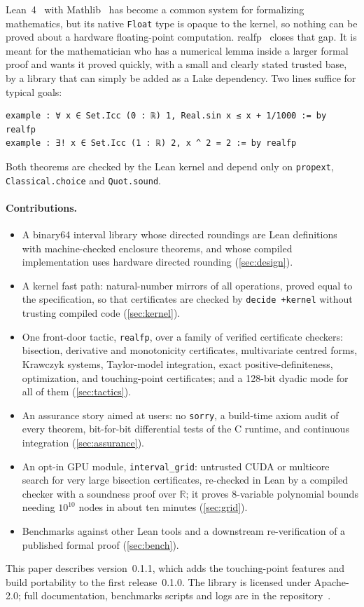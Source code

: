 \documentclass[11pt]{article}
\theoremstyle{definition}
\theoremstyle{remark}
\newcommand{\R}{\mathbb{R}}
\newcommand{\lean}[1]{\texttt{#1}}
\newcommand{\realfp}{\textsf{realfp}}
\begin{document}
Lean~4~\cite{lean4} with Mathlib~\cite{mathlib} has become a common system
for formalizing mathematics, but its native \lean{Float} type is opaque to
the kernel, so nothing can be proved about a hardware floating-point
computation. \realfp{}~\cite{realfp} closes that gap. It is meant for the
mathematician who has a numerical lemma inside a larger formal proof and
wants it proved quickly, with a small and clearly stated trusted base, by a
library that can simply be added as a Lake dependency. Two lines suffice for
typical goals:
\begin{lstlisting}
example : ∀ x ∈ Set.Icc (0 : ℝ) 1, Real.sin x ≤ x + 1/1000 := by realfp
example : ∃! x ∈ Set.Icc (1 : ℝ) 2, x ^ 2 = 2 := by realfp
\end{lstlisting}
Both theorems are checked by the Lean kernel and depend only on
\lean{propext}, \lean{Classical.choice} and \lean{Quot.sound}.

\paragraph{Contributions.}
\begin{itemize}[nosep]
\item A binary64 interval library whose directed roundings are Lean
  definitions with machine-checked enclosure theorems, and whose compiled
  implementation uses hardware directed rounding (\cref{sec:design}).
\item A kernel fast path: natural-number mirrors of all operations, proved
  equal to the specification, so that certificates are checked by
  \lean{decide +kernel} without trusting compiled code (\cref{sec:kernel}).
\item One front-door tactic, \lean{realfp}, over a family of verified
  certificate checkers: bisection, derivative and monotonicity certificates,
  multivariate centred forms, Krawczyk systems, Taylor-model integration,
  exact positive-definiteness, optimization, and touching-point
  certificates; and a 128-bit dyadic mode for all of them (\cref{sec:tactics}).
\item An assurance story aimed at users: no \lean{sorry}, a build-time axiom
  audit of every theorem, bit-for-bit differential tests of the C runtime,
  and continuous integration (\cref{sec:assurance}).
\item An opt-in GPU module, \lean{interval\_grid}: untrusted CUDA or
  multicore search for very large bisection certificates, re-checked in Lean
  by a compiled checker with a soundness proof over $\R$; it proves
  8-variable polynomial bounds needing $10^{10}$ nodes in about ten minutes
  (\cref{sec:grid}).
\item Benchmarks against other Lean tools and a downstream re-verification
  of a published formal proof (\cref{sec:bench}).
\end{itemize}
This paper describes version~0.1.1, which adds the touching-point
features and build portability to the first release~0.1.0. The library is licensed under
Apache-2.0; full documentation, benchmarks scripts and logs are in the
repository~\cite{realfp}.
\end{document}
